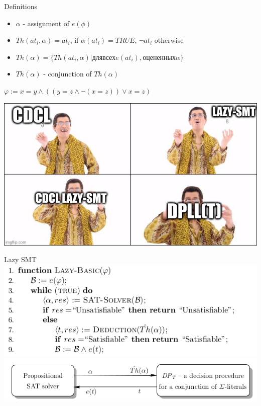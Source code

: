 \documentclass{beamer}
\begin{document}
\begin{frame}{Definitions}
\begin{block}{}
\begin{itemize}
\item $\alpha$ - assignment of $e(\phi)$
\item $Th(at_i, \alpha) = at_i$, if $\alpha(at_i) = TRUE$, $\lnot at_i$ otherwise
\item $Th(\alpha) = \{Th(at_i, \alpha)| для всех e(at_i), оцененных \alpha\}$
\item $\overline{Th(\alpha)}$ - conjunction of $Th(\alpha)$
\end{itemize}
\end{block}
$\varphi := x = y \wedge ((y = z \wedge \lnot(x = z)) \vee x = z)$
\end{frame}

\begin{frame}
\includegraphics[scale=0.45]{pineapple}
\end{frame}

\begin{frame}{Lazy SMT}
\includegraphics[scale=0.5]{Lazy_SMT1.png}
\includegraphics[scale=0.5]{Lazy_SMT.png}
\end{frame}
\end{document}
